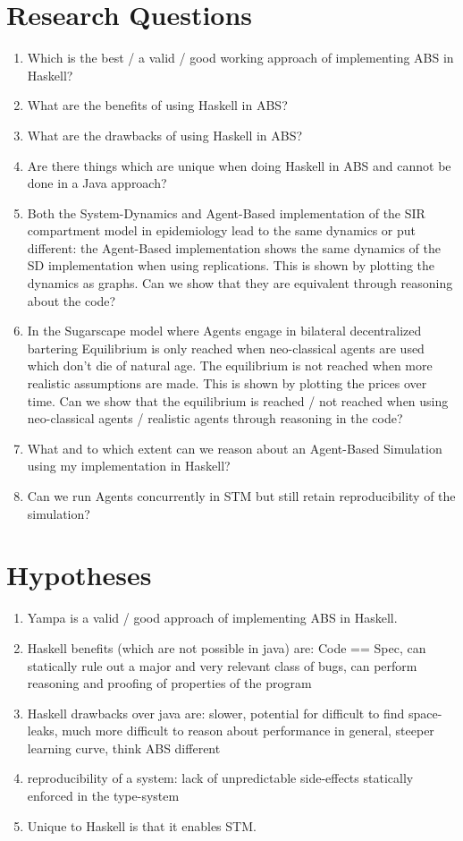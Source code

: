 \section{Research Questions}
\begin{enumerate}
	\item Which is the best / a valid / good working approach of implementing ABS in Haskell?
	\item What are the benefits of using Haskell in ABS?
	\item What are the drawbacks of using Haskell in ABS?
	\item Are there things which are unique when doing Haskell in ABS and cannot be done in a Java approach?
	\item Both the System-Dynamics and Agent-Based implementation of the SIR compartment model in epidemiology lead to the same dynamics or put different: the Agent-Based implementation shows the same dynamics of the SD implementation when using replications. This is shown by plotting the dynamics as graphs. Can we show that they are equivalent through reasoning about the code?
	\item In the Sugarscape model where Agents engage in bilateral decentralized bartering Equilibrium is only reached when neo-classical agents are used which don't die of natural age. The equilibrium is not reached when more realistic assumptions are made. This is shown by plotting the prices over time. Can we show that the equilibrium is reached / not reached when using neo-classical agents / realistic agents through reasoning in the code?
	\item What and to which extent can we reason about an Agent-Based Simulation using my implementation in Haskell?
	\item Can we run Agents concurrently in STM but still retain reproducibility of the simulation?
\end{enumerate}

\section{Hypotheses}
\begin{enumerate}
	\item Yampa is a valid / good approach of implementing ABS in Haskell.
	\item Haskell benefits (which are not possible in java) are: Code == Spec, can statically rule out a major and very relevant class of bugs, can perform reasoning and proofing of properties of the program
	\item Haskell drawbacks over java are: slower, potential for difficult to find space-leaks, much more difficult to reason about performance in general, steeper learning curve, think ABS different 
	\item reproducibility of a system: lack of unpredictable side-effects statically enforced in the type-system
	\item Unique to Haskell is that it enables STM.
\end{enumerate}